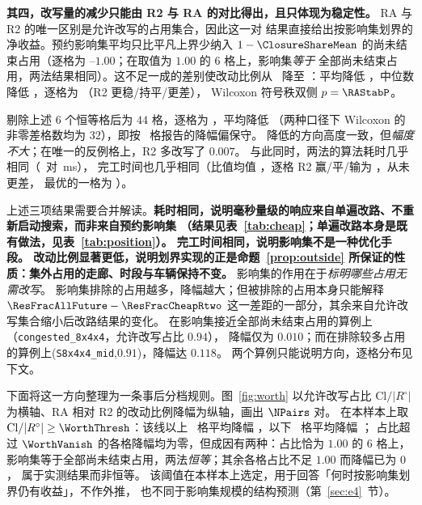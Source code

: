 \textbf{其四，改写量的减少只能由 R2 与 RA 的对比得出，且只体现为稳定性。} RA 与 R2 的唯一区别是允许改写的占用集合，因此这一对
结果直接给出按影响集划界的净收益。预约影响集平均只比平凡上界少纳入 \(1-\ClosureShareMean\)
的尚未结束占用（逐格为 \ClosureShareLo--\(1.00\)；在取值为 \(1.00\) 的 \(6\) 格上，影响集\emph{等于}
全部尚未结束占用，两法结果相同）。这不足一成的差别使改动比例从 \ResFracAllFuture\ 降至
\ResFracCheapRtwo：平均降低 \RAStabMean，中位数降低 \RAStabMed，逐格为 \RAStabWTL（R2 更稳/持平/更差），
Wilcoxon 符号秩双侧 \(p=\RAStabP\)。

剔除上述 \(6\) 个恒等格后为 \(44\) 格，逐格为 \RAStabWTLNet，平均降低 \RAStabMeanNet
（两种口径下 Wilcoxon 的非零差格数均为 \(32\)），即按 \NPairs\ 格报告的降幅偏保守。
降低的方向高度一致，但\emph{幅度不大}；在唯一的反例格上，R2 多改写了 \(0.007\)。
与此同时，两法的算法耗时几乎相同（\MsCheapRtwo\ 对 \MsAllFuture\,ms），
完工时间也几乎相同（比值均值 \RACmaxRatio，逐格 R2 赢/平/输为 \WinVsAllFuture，从未更差，
最优的一格为 \RACmaxLo）。

上述三项结果需要合并解读。\textbf{耗时相同，说明毫秒量级的响应来自单遍改路、不重新启动搜索，而非来自预约影响集
（结果见表~\ref{tab:cheap}；单遍改路本身是既有做法，见表~\ref{tab:position}）。
完工时间相同，说明影响集不是一种优化手段。
改动比例显著更低，说明划界实现的正是命题~\ref{prop:outside} 所保证的性质：集外占用的走廊、时段与车辆保持不变。}
影响集的作用在于\emph{标明哪些占用无需改写}。
影响集排除的占用越多，降幅越大；但被排除的占用本身只能解释
\(\ResFracAllFuture-\ResFracCheapRtwo\) 这一差距的一部分，其余来自允许改写集合缩小后改路结果的变化。
在影响集接近全部尚未结束占用的算例上（\texttt{congested\_8x4x4}，允许改写占比 \(0.94\)），
降幅仅为 \(0.010\)；而在排除较多占用的算例上(\texttt{S8x4x4\_mid},\(0.91\))，降幅达 \(0.118\)。
两个算例只能说明方向，逐格分布见下文。

下面将这一方向整理为一条事后分档规则。图~\ref{fig:worth} 以允许改写占比
\(\mathrm{Cl}/|R^{\circ}|\) 为横轴、RA 相对 R2 的改动比例降幅为纵轴，画出 \(\NPairs\) 对。
在本样本上取 \(\mathrm{Cl}/|R^{\circ}|\ge\WorthThresh\)：该线以上 \WorthHighN\ 格平均降幅
\WorthHighMean，以下 \WorthLowN\ 格平均降幅 \WorthLowMean；
占比超过 \(\WorthVanish\) 的各格降幅均为零，但成因有两种：占比恰为 \(1.00\) 的 \(6\) 格上，
影响集等于全部尚未结束占用，两法\emph{恒等}；其余各格占比不足 \(1.00\) 而降幅已为 \(0\)，
属于实测结果而非恒等。
该阈值在本样本上选定，用于回答「何时按影响集划界仍有收益」，不作外推，
也不同于影响集规模的结构预测（第~\ref{sec:e4}~节）。


